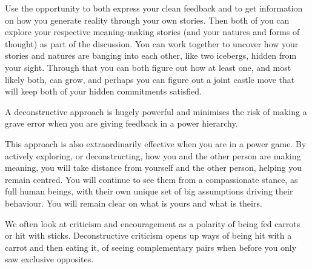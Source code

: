 Use the opportunity to both express your clean feedback and to get information on how you generate reality through your own stories. Then both of you can explore your respective meaning\hyp{}making stories (and your natures and forms of thought) as part of the discussion. You can work together to uncover how your stories and natures are banging into each other, like two icebergs, hidden from your sight. Through that you can both figure out how at least one, and most likely both, can grow, and perhaps you can figure out a joint castle move that will keep both of your hidden commitments satisfied.


A deconstructive approach is hugely powerful and minimises the risk of making a grave error when you are giving feedback in a power hierarchy.


This approach is also extraordinarily effective when you are in a power game. By actively exploring, or deconstructing, how you and the other person are making meaning, you will take distance from yourself and the other person, helping you remain centred. You will continue to see them from a compassionate stance, as full human beings, with their own unique set of big assumptions driving their behaviour. You will remain clear on what is yours and what is theirs.


We often look at criticism and encouragement as a polarity of being fed carrots or hit with sticks. Deconstructive criticism opens up ways of being hit with a carrot and then eating it, of seeing complementary pairs when before you only saw exclusive opposites.


